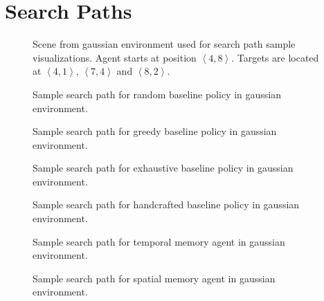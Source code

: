 \chapter{Search Paths}
\label{app:paths}

\begin{figure}
    \centering
    
    \caption[Scene for search paths]{Scene from gaussian environment used for search path sample visualizations. Agent starts at position \(\left\langle 4, 8 \right\rangle\). Targets are located at \(\left\langle 4, 1 \right\rangle\), \(\left\langle 7, 4 \right\rangle\) and \(\left\langle 8, 2 \right\rangle\).}
    \label{fig:path-scene}
\end{figure}    

\begin{figure}
    \centering
    
    \caption[Random baseline search path]{Sample search path for random baseline policy in gaussian environment.}
    \label{fig:path-random}
\end{figure}

\begin{figure}
    \centering
    
    \caption[Greedy baseline search path]{Sample search path for greedy baseline policy in gaussian environment.}
    \label{fig:path-greedy}
\end{figure}

\begin{figure}
    \centering
    
    \caption[Exhaustive baseline search path]{Sample search path for exhaustive baseline policy in gaussian environment.}
    \label{fig:path-exhaustive}
\end{figure}

\begin{figure}
    \centering
    
    \caption[Handcrafted baseline search path]{Sample search path for handcrafted baseline policy in gaussian environment.}
    \label{fig:path-handcrafted}
\end{figure}

\begin{figure}
    \centering
    
    \caption[Temporal memory agent search path]{Sample search path for temporal memory agent in gaussian environment.}
    \label{fig:path-lstm}
\end{figure}

\begin{figure}
    \centering
    
    \caption[Spatial memory agent search path]{Sample search path for spatial memory agent in gaussian environment.}
    \label{fig:path-map}
\end{figure}